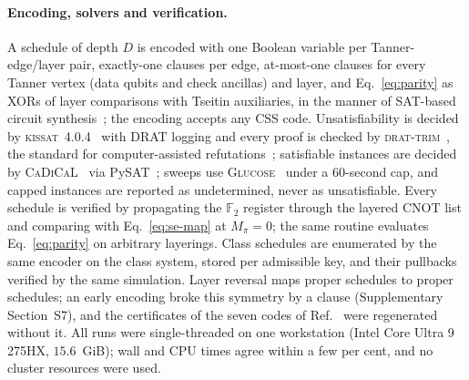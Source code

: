 \documentclass[reprint,twocolumn,superscriptaddress,nofootinbib]{revtex4-2}
\theoremstyle{plain}
\newcommand{\F}{\mathbb{F}_2}
\begin{document}
\paragraph*{Encoding, solvers and verification.}
A schedule of depth $D$ is encoded with one Boolean variable per
Tanner-edge/layer pair, exactly-one clauses per edge, at-most-one clauses
for every Tanner vertex (data qubits and check ancillas) and layer, and
Eq.~\eqref{eq:parity} as XORs of layer comparisons with Tseitin
auxiliaries, in the manner of SAT-based circuit
synthesis~\cite{Peham2023,TanCong2020}; the encoding accepts any CSS code.
Unsatisfiability is decided by \textsc{kissat}~4.0.4~\cite{Biere2024Kissat}
with DRAT logging and every proof is checked by
\textsc{drat-trim}~\cite{Wetzler2014DRAT,HeuleHuntWetzler2013}, the
standard for computer-assisted refutations~\cite{Heule2016}; satisfiable
instances are decided by \textsc{CaDiCaL}~\cite{Biere2024CaDiCaL} via
PySAT~\cite{Ignatiev2018PySAT}; sweeps use
\textsc{Glucose}~\cite{AudemardSimon2009} under a $60$-second cap, and
capped instances are reported as undetermined, never as unsatisfiable.
Every schedule is verified by propagating the $\F$ register through the
layered CNOT list and comparing with Eq.~\eqref{eq:se-map} at $M_\pi=0$;
the same routine evaluates Eq.~\eqref{eq:parity} on arbitrary layerings.
Class schedules are enumerated by the same encoder on the class system,
stored per admissible key, and their pullbacks verified by the same
simulation. Layer reversal maps proper schedules to proper schedules; an
early encoding broke this symmetry by a clause (Supplementary Section~S7),
and the certificates of the seven codes of Ref.~\cite{Bravyi2024} were
regenerated without it. All runs were single-threaded on one workstation
(Intel Core Ultra 9 275HX, $15.6$~GiB); wall and CPU times agree within a
few per cent, and no cluster resources were used.
\end{document}
